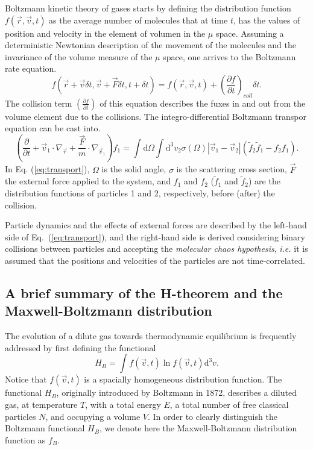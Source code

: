 Boltzmann kinetic theory of gases starts by defining the distribution function 
$f(\vec{r},\vec{v},t)$ as the average number of molecules that at time $t$, has the 
values of position and velocity in the element of volumen in the $\mu$ space.
Assuming a deterministic Newtonian description of the movement of the molecules 
and the invariance of the volume measure of the $\mu$ space, one arrives to the Boltzmann rate equation.
%
\begin{equation}
	f(\vec{r}+\vec{v}\delta t, \vec{v}+\vec{F} \delta t, t+\delta t)=f(\vec{r},\vec{v},t)+\left( \frac{\partial f}{\partial t} \right)_{coll} \delta t.
\end{equation}
%
The collision term $\left( \frac{\partial f}{\partial t}\right)$ of this equation 
describes the fuxes in and out from the volume element due to the collisions.
The integro-differential Boltzmann transpor equation can be cast into.
%
\begin{equation}\label{eq:transport}
  \left(
    \frac{\partial}{\partial t}+\vec{v}_1 \cdot\nabla_{\vec r}
    +\frac{\vec{F}}{m}\cdot\nabla_{\vec v_1}
  \right)f_1=\int\mathrm{d}\Omega\int
    \mathrm{d}^{3}v_2\sigma(\Omega)|\vec{v}_1-\vec{v}_2|(\tilde f_2\tilde f_1-f_2f_1).
\end{equation}
%
In Eq. (\ref{eq:transport}), $\Omega$ is the solid angle, $\sigma$ is the
scattering cross section, $\vec F$ the
external force applied to the system, and $f_1$ and $f_2$ ($\tilde f_1$ and $\tilde f_2$) are the distribution
functions of particles 1 and 2, respectively, before (after) the collision.

Particle dynamics and the effects of external forces are described
by the left-hand side of Eq.~(\ref{eq:transport}), and the right-hand side
is derived considering binary collisions between particles and accepting
the \textit{molecular chaos hypothesis}, \textit{i.e.} it is assumed that
the positions and velocities of the particles are not time-correlated.


\subsection{A brief summary of the H-theorem and the Maxwell-Boltzmann distribution}

The evolution of a dilute gas towards thermodynamic equilibrium is frequently
addressed by first defining the functional \cite{bib:tolman,bib:huang}
%
\begin{equation}\label{eq:hbfunctional}
   H_{B}=\int f(\vec{v},t) \ln f(\vec{v},t) \mathrm{d}^{3}v.
\end{equation} 
%
Notice that $f(\vec{v},t)$ is a spacially homogeneous distribution function.
The functional $H_B$,
originally introduced by Boltzmann in 1872,
describes a diluted gas, at temperature $T$, with a total energy $E$, a total
number of free classical particles $N$, and occupying a volume $V$.
In order to clearly distinguish the Boltzmann functional $H_B$, we denote here
the Maxwell-Boltzmann distribution function as $f_B$.

